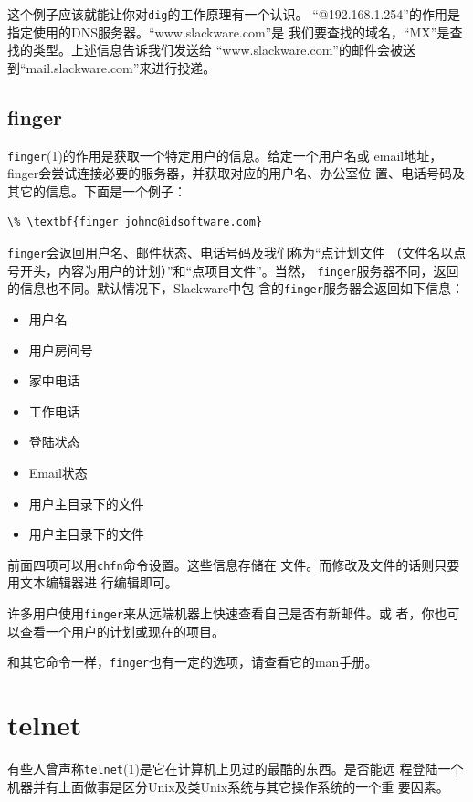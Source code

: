 这个例子应该就能让你对\texttt{dig}的工作原理有一个认识。
``@192.168.1.254''的作用是指定使用的DNS服务器。``www.slackware.com''是
我们要查找的域名，``MX''是查找的类型。上述信息告诉我们发送给
``www.slackware.com''的邮件会被送到``mail.slackware.com''来进行投递。

\subsection{finger}
\label{chap:basicNetworkCommands:dnsTools:finger}
\texttt{finger}(1)的作用是获取一个特定用户的信息。给定一个用户名或
email地址，finger会尝试连接必要的服务器，并获取对应的用户名、办公室位
置、电话号码及其它的信息。下面是一个例子：
\begin{Verbatim}[frame=single, commandchars=\\\{\}]
\% \textbf{finger johnc@idsoftware.com}
\end{Verbatim}

\texttt{finger}会返回用户名、邮件状态、电话号码及我们称为``点计划文件
（文件名以点号开头，内容为用户的计划）''和``点项目文件''。当然，
\texttt{finger}服务器不同，返回的信息也不同。默认情况下，Slackware中包
含的\texttt{finger}服务器会返回如下信息：
\begin{itemize}
\item 用户名
\item 用户房间号
\item 家中电话
\item 工作电话
\item 登陆状态
\item Email状态
\item 用户主目录下的文件
\item 用户主目录下的文件
\end{itemize}
前面四项可以用\texttt{chfn}命令设置。这些信息存储在
文件。而修改及文件的话则只要用文本编辑器进
行编辑即可。

许多用户使用\texttt{finger}来从远端机器上快速查看自己是否有新邮件。或
者，你也可以查看一个用户的计划或现在的项目。

和其它命令一样，\texttt{finger}也有一定的选项，请查看它的man手册。


\section{telnet}
\label{chap:basicNetworkCommands:telnet}
有些人曾声称\texttt{telnet}(1)是它在计算机上见过的最酷的东西。是否能远
程登陆一个机器并有上面做事是区分Unix及类Unix系统与其它操作系统的一个重
要因素。

